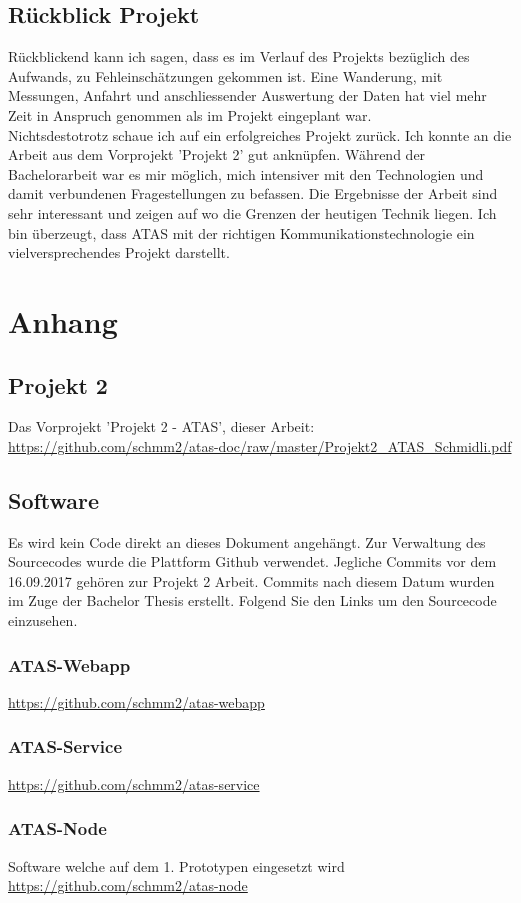 \documentclass[11pt,english,german]{report}
\theoremstyle{definition}
\begin{document}
\section{Rückblick Projekt}
Rückblickend kann ich sagen, dass es im Verlauf des Projekts bezüglich des Aufwands, zu Fehleinschätzungen gekommen ist. Eine Wanderung, mit Messungen, Anfahrt und anschliessender Auswertung der Daten hat viel mehr Zeit in Anspruch genommen als im Projekt eingeplant war.\\[0.3cm]
Nichtsdestotrotz schaue ich auf ein erfolgreiches Projekt zurück. Ich konnte an die Arbeit aus dem Vorprojekt 'Projekt 2' gut anknüpfen. Während der Bachelorarbeit war es mir möglich, mich intensiver mit den Technologien und damit verbundenen Fragestellungen zu befassen. Die Ergebnisse der Arbeit sind sehr interessant und zeigen auf wo die Grenzen der heutigen Technik liegen. Ich bin überzeugt, dass ATAS mit der richtigen Kommunikationstechnologie ein vielversprechendes Projekt darstellt.


\chapter*{Anhang}
\section{Projekt 2}
Das Vorprojekt 'Projekt 2 - ATAS', dieser Arbeit:\\ \url{https://github.com/schmm2/atas-doc/raw/master/Projekt2_ATAS_Schmidli.pdf}
\section{Software}
Es wird kein Code direkt an dieses Dokument angehängt. Zur Verwaltung des Sourcecodes wurde die Plattform Github verwendet. Jegliche Commits vor dem 16.09.2017 gehören zur Projekt 2 Arbeit. Commits nach diesem Datum wurden im Zuge der Bachelor Thesis erstellt. 
Folgend Sie den Links um den Sourcecode einzusehen.
\subsection{ATAS-Webapp}
\url{https://github.com/schmm2/atas-webapp}
\subsection{ATAS-Service}
\url{https://github.com/schmm2/atas-service}
\subsection{ATAS-Node}
Software welche auf dem 1. Prototypen eingesetzt wird\\
\url{https://github.com/schmm2/atas-node}
\end{document}
